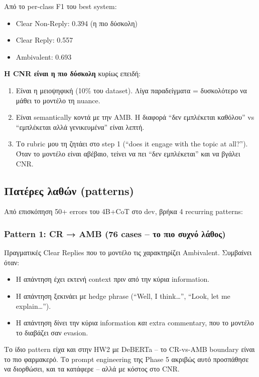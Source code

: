 \documentclass[12pt]{fphw}
\begin{document}
Από το per-class F1 του best system:
\begin{itemize}
    \item Clear Non-Reply: 0.394 (η πιο δύσκολη)
    \item Clear Reply: 0.557
    \item Ambivalent: 0.693
\end{itemize}

\textbf{Η CNR είναι η πιο δύσκολη} κυρίως επειδή:

\begin{enumerate}
    \item Είναι η μειοψηφική (10\% του dataset). Λίγα παραδείγματα = δυσκολότερο να μάθει το μοντέλο τη nuance.
    \item Είναι semantically κοντά με την AMB. Η διαφορά ``δεν εμπλέκεται καθόλου'' vs ``εμπλέκεται αλλά γενικευμένα'' είναι λεπτή.
    \item Το rubric μου τη ζητάει στο step 1 (``does it engage with the topic at all?''). Όταν το μοντέλο είναι αβέβαιο, τείνει να πει ``δεν εμπλέκεται'' και να βγάλει CNR.
\end{enumerate}

\subsection{Πατέρες λαθών (patterns)}

Από επισκόπηση 50+ errors του 4B+CoT στο dev, βρήκα 4 recurring patterns:

\subsubsection{Pattern 1: CR → AMB (76 cases -- το πιο συχνό λάθος)}

Πραγματικές Clear Replies που το μοντέλο τις χαρακτηρίζει Ambivalent. Συμβαίνει όταν:

\begin{itemize}
    \item Η απάντηση έχει εκτενή context πριν από την κύρια information.
    \item Η απάντηση ξεκινάει με hedge phrase (``Well, I think\dots'', ``Look, let me explain\dots'').
    \item Η απάντηση δίνει την κύρια information \emph{και} extra commentary, που το μοντέλο το διαβάζει σαν evasion.
\end{itemize}

Το ίδιο pattern είχα και στην HW2 με DeBERTa -- το CR-vs-AMB boundary είναι το πιο φαρμακερό. Το prompt engineering της Phase 5 ακριβώς αυτό προσπάθησε να διορθώσει, και τα κατάφερε -- αλλά με κόστος στο CNR.
\end{document}
